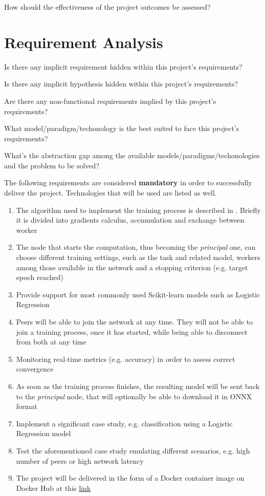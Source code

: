 \documentclass[12pt,a4paper,oneside,article]{article}
\begin{document}
			How should the effectiveness of the project outcomes be assessed?
	
	\section{Requirement Analysis}
		Is there any implicit requirement hidden within this project's requirements?
		
		Is there any implicit hypothesis hidden within this project's requirements?
		
		Are there any non-functional requirements implied by this project's requirements?
		
		What model/paradigm/techonology is the best suited to face this project's requirements?
		
		What's the abstraction gap among the available models/paradigms/techonologies and the problem to be solved?
		
		The following requirements are considered \textbf{mandatory} in order to successfully deliver the project. Technologies that will be used are listed as well.
		
		\begin{enumerate}
			\item The algorithm used to implement the training process is described in \cite{watcharapichat2016ako}. Briefly it is divided into gradients calculus, accumulation and exchange between worker
			\item The node that starts the computation, thus becoming the \emph{principal} one, can choose different training settings, such as the task and related model, workers among those available in the network and a stopping criterion (e.g. target epoch reached)
			\item Provide support for most commonly used Scikit-learn models such as Logistic Regression
			\item Peers will be able to join the network at any time. They will not be able to join a training process, once it has started, while being able to disconnect from both at any time
			\item Monitoring real-time metrics (e.g. accuracy) in order to assess correct convergence
			\item As soon as the training process finishes, the resulting model will be sent back to the \emph{principal} node, that will optionally be able to download it in ONNX format
			\item Implement a significant case study, e.g. classification using a Logistic Regression model
			\item Test the aforementioned case study emulating different scenarios, e.g. high number of peers or high network latency
			\item The project will be delivered in the form of a Docker container image on Docker Hub at this \href{https://hub.docker.com/repository/docker/filippobarbari/ddml-peer}{link}
		\end{enumerate}
	
\end{document}
